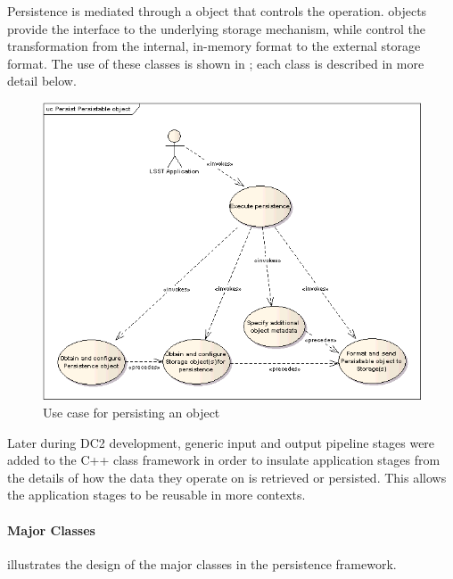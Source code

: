 Persistence is mediated through a  object that controls the
operation.   objects provide the interface to the underlying
storage mechanism, while  control the transformation from
the internal, in-memory format to the external storage format.  The use
of these classes is shown in ; each class is
described in more detail below.

\begin{figure}[htbp]
\includegraphics[width=\textwidth]{figures/PersistObject.png}
\caption{Use case for persisting an object}
\label{persistence-use}
\end{figure}

Later during DC2 development, generic input and output pipeline stages
were added to the C++ class framework in order to insulate application
stages from the details of how the data they operate on is retrieved or
persisted.  This allows the application stages to be reusable in more
contexts.

\paragraph{Major Classes}

 illustrates the design of the major classes in
the persistence framework.

